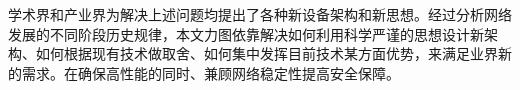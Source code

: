 学术界和产业界为解决上述问题均提出了各种新设备架构和新思想。经过分析网络发展的不同阶段历史规律，本文力图依靠解决如何利用科学严谨的思想设计新架构、如何根据现有技术做取舍、如何集中发挥目前技术某方面优势，来满足业界新的需求。在确保高性能的同时、兼顾网络稳定性提高安全保障。












































